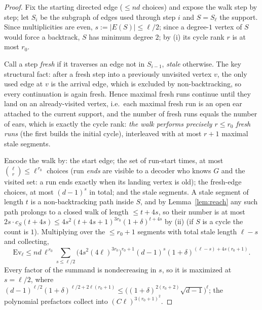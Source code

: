 \documentclass[11pt]{article}
\theoremstyle{remark}
\begin{document}
\begin{proof}
Fix the starting directed edge ($\le nd$ choices) and expose the walk
step by step; let $S_i$ be the subgraph of edges used through step $i$
and $S=S_{\ell}$ the support. Since multiplicities are even,
$s:=|E(S)|\le\ell/2$; since a degree-$1$ vertex of $S$ would force a
backtrack, $S$ has minimum degree $2$; by (i) its cycle rank $r$ is at
most $r_0$.

Call a step \emph{fresh} if it traverses an edge not in $S_{i-1}$,
\emph{stale} otherwise. The key structural fact: after a fresh step
into a previously unvisited vertex $v$, the only used edge at $v$ is
the arrival edge, which is excluded by non-backtracking, so every
continuation is again fresh. Hence maximal fresh runs continue until
they land on an already-visited vertex, i.e.\ each maximal fresh run is
an open ear attached to the current support, and the number of fresh
runs equals the number of ears, which is exactly the cycle rank:
\emph{the walk performs precisely $r\le r_0$ fresh runs} (the first
builds the initial cycle), interleaved with at most $r+1$ maximal stale
segments.

Encode the walk by: the start edge; the set of run-start times, at most
$\binom{\ell}{r}\le\ell^{\,r_0}$ choices (run \emph{ends} are visible
to a decoder who knows $G$ and the visited set: a run ends exactly when
its landing vertex is old); the fresh-edge choices, at most $(d-1)^{s}$
in total; and the stale segments. A stale segment of length $t$ is a
non-backtracking path inside $S$, and by Lemma~\ref{lem:reach} any such
path prolongs to a closed walk of length $\le t+4s$, so their number is
at most $2s\cdot c_S(t+4s)\le 4s^2(t+4s+1)^{3r_0}(1+\delta)^{t+4s}$ by
(ii) (if $S$ is a cycle the count is $1$). Multiplying over the
$\le r_0+1$ segments with total stale length $\ell-s$ and collecting,
\[
\mathrm{Ev}_\ell\le nd\,\ell^{\,r_0}\!\!\sum_{s\le\ell/2}\!
\big(4s^2(4\ell)^{3r_0}\big)^{r_0+1}
(d-1)^{s}(1+\delta)^{(\ell-s)+4s(r_0+1)} .
\]
Every factor of the summand is nondecreasing in $s$, so it is maximized
at $s=\ell/2$, where
$(d-1)^{\ell/2}(1+\delta)^{\ell/2+2\ell(r_0+1)}\le
\big((1+\delta)^{2(r_0+2)}\sqrt{d-1}\big)^{\ell}$; the polynomial
prefactors collect into $(C\ell)^{3(r_0+1)^2}$.
\end{proof}
\end{document}
